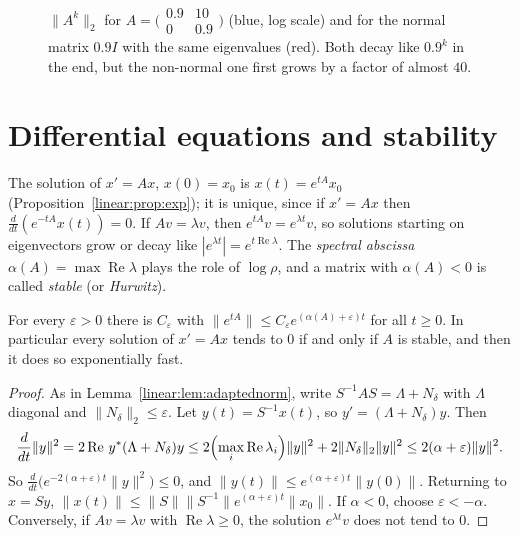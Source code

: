 \begin{figure}[ht]
\centering
{}
\caption{$\|A^k\|_2$ for $A=\bigl(\begin{smallmatrix}0.9&10\\0&0.9\end{smallmatrix}\bigr)$ (blue, log scale) and for the normal matrix
$0.9I$ with the same eigenvalues (red). Both decay like $0.9^k$ in the end, but the non-normal one first grows by a factor of almost
$40$.}
\label{linear:fig:transient}
\end{figure}

\section{Differential equations and stability}

The solution of $x'=Ax$, $x(0)=x_0$ is $x(t)=e^{tA}x_0$ (Proposition~\ref{linear:prop:exp}); it is unique, since if $x'=Ax$ then
$\frac d{dt}(e^{-tA}x(t))=0$. If $Av=\lambda v$, then $e^{tA}v=e^{\lambda t}v$, so solutions starting on eigenvectors grow or decay
like $|e^{\lambda t}|=e^{t\operatorname{Re}\lambda}$. The \emph{spectral abscissa} $\alpha(A)=\max\operatorname{Re}\lambda$ plays the
role of $\log\rho$, and a matrix with $\alpha(A)<0$ is called \emph{stable} (or \emph{Hurwitz}).

\begin{theorem}[stability]\label{linear:thm:stability}
For every $\varepsilon>0$ there is $C_\varepsilon$ with $\|e^{tA}\|\le C_\varepsilon e^{(\alpha(A)+\varepsilon)t}$ for all $t\ge0$. In
particular every solution of $x'=Ax$ tends to $0$ if and only if $A$ is stable, and then it does so exponentially fast.
\end{theorem}
\begin{proof}
As in Lemma~\ref{linear:lem:adaptednorm}, write $S^{-1}AS=\Lambda+N_\delta$ with $\Lambda$ diagonal and $\|N_\delta\|_2\le\varepsilon$. Let
$y(t)=S^{-1}x(t)$, so $y'=(\Lambda+N_\delta)y$. Then
\[
\frac d{dt}\|y\|^2=2\operatorname{Re}\,y^*(\Lambda+N_\delta)y\le2\Bigl(\max_i\operatorname{Re}\lambda_i\Bigr)\|y\|^2+2\|N_\delta\|_2\|y\|^2\le
2(\alpha+\varepsilon)\|y\|^2.
\]
So $\frac d{dt}\bigl(e^{-2(\alpha+\varepsilon)t}\|y\|^2\bigr)\le0$, and $\|y(t)\|\le e^{(\alpha+\varepsilon)t}\|y(0)\|$. Returning to $x=Sy$,
$\|x(t)\|\le\|S\|\|S^{-1}\|e^{(\alpha+\varepsilon)t}\|x_0\|$. If $\alpha<0$, choose $\varepsilon<-\alpha$. Conversely, if $Av=\lambda v$ with
$\operatorname{Re}\lambda\ge0$, the solution $e^{\lambda t}v$ does not tend to $0$.
\end{proof}

